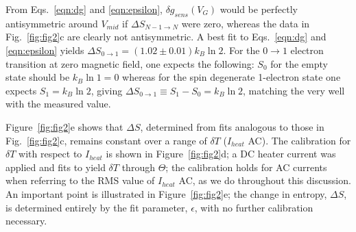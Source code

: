 \documentclass[twocolumn,showpacs,amsmath,amssymb,prl,aps,superscriptaddress]{revtex4-1}
\begin{document}
From Eqs.~\ref{eqn:dg} and \ref{eqn:epsilon}, $\delta g_{sens}(V_G)$ would be perfectly antisymmetric around $V_{mid}$ if $\Delta S_{N-1\rightarrow N}$ were zero, whereas the data in Fig.~\ref{fig:fig2}c are clearly not antisymmetric. A best fit to Eqs.~\ref{eqn:dg} and \ref{eqn:epsilon} yields $\Delta S_{0\rightarrow 1}=(1.02 \pm 0.01) k_B \ln{2}$. For the $0 \rightarrow 1$ electron transition at zero magnetic field, one expects the following: $S_0$ for the empty state should be $k_B \ln{1}=0$ whereas for the spin degenerate 1-electron state one expects $S_1=k_B\ln{2}$, giving $\Delta S_{0\rightarrow 1}\equiv S_1 - S_0 =k_B\ln{2}$, matching the very well with the measured value.

Figure~\ref{fig:fig2}e shows that $\Delta S$, determined from fits analogous to those in Fig.~\ref{fig:fig2}c, remains constant over a range of $\delta T$ ($I_{heat}$ AC). The calibration for $\delta T$ with respect to $I_{heat}$ is shown in Figure~\ref{fig:fig2}d; a DC heater current was applied and fits to \label{eqn:g} yield $\delta T$ through $\Theta$; the calibration holds for AC currents when referring to the RMS value of $I_{heat}$ AC, as we do throughout this discussion. An important point is illustrated in Figure~\ref{fig:fig2}e; the change in entropy, $\Delta S$, is determined entirely by the fit parameter, $\epsilon$, with no further calibration necessary.
\end{document}
